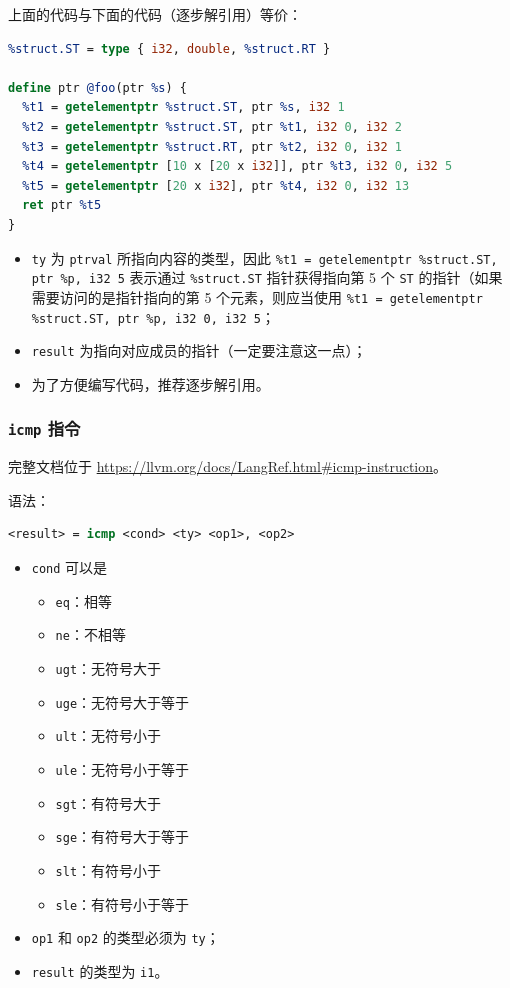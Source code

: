 上面的代码与下面的代码（逐步解引用）等价：
\begin{lstlisting}[language=llvm]
%struct.RT = type { i8, [10 x [20 x i32]], i8 }
%struct.ST = type { i32, double, %struct.RT }

define ptr @foo(ptr %s) {
  %t1 = getelementptr %struct.ST, ptr %s, i32 1
  %t2 = getelementptr %struct.ST, ptr %t1, i32 0, i32 2
  %t3 = getelementptr %struct.RT, ptr %t2, i32 0, i32 1
  %t4 = getelementptr [10 x [20 x i32]], ptr %t3, i32 0, i32 5
  %t5 = getelementptr [20 x i32], ptr %t4, i32 0, i32 13
  ret ptr %t5
}
\end{lstlisting}

\begin{itemize}
  \item \texttt{ty} 为 \texttt{ptrval} 所指向内容的类型，因此
    \texttt{\%t1 = getelementptr \%struct.ST, ptr \%p, i32 5}
    表示通过 \texttt{\%struct.ST} 指针获得指向第 5 个 \texttt{ST}
    的指针（如果需要访问的是指针指向的第 5 个元素，则应当使用
    \texttt{\%t1 = getelementptr \%struct.ST, ptr \%p, i32 0, i32 5}；
  \item \texttt{result} 为指向对应成员的指针（一定要注意这一点）；
  \item 为了方便编写代码，推荐逐步解引用。
\end{itemize}

\subsubsection{\texttt{icmp} 指令}\label{LLVM-icmp-instructions}

\begin{remark}
完整文档位于 \url{https://llvm.org/docs/LangRef.html\#icmp-instruction}。
\end{remark}

语法：
\begin{lstlisting}[language=llvm]
<result> = icmp <cond> <ty> <op1>, <op2>
\end{lstlisting}

\begin{itemize}
  \item \texttt{cond} 可以是
    \begin{itemize}
      \item \texttt{eq}：相等
      \item \texttt{ne}：不相等
      \item \texttt{ugt}：无符号大于
      \item \texttt{uge}：无符号大于等于
      \item \texttt{ult}：无符号小于
      \item \texttt{ule}：无符号小于等于
      \item \texttt{sgt}：有符号大于
      \item \texttt{sge}：有符号大于等于
      \item \texttt{slt}：有符号小于
      \item \texttt{sle}：有符号小于等于
    \end{itemize}
  \item \texttt{op1} 和 \texttt{op2} 的类型必须为 \texttt{ty}；
  \item \texttt{result} 的类型为 \texttt{i1}。
\end{itemize}

